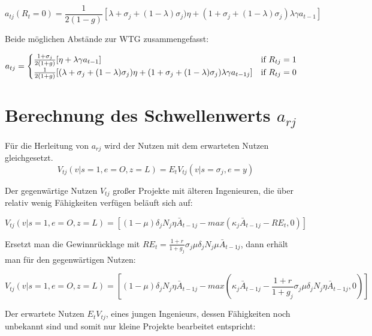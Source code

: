 \begin{equation}
\boxed{a_{tj}(R_{t}=0)=\frac{1}{2(1-g)}\left[\lambda+\sigma_j+(1-\lambda)\sigma_j)\eta+(1+\sigma_j+(1-\lambda)\sigma_j)\lambda\gamma a_{t-1}\right]}
\end{equation}


Beide möglichen Abstände zur WTG zusammengefasst:


\begin{equation}
a_{tj}=\begin{cases}\frac{1+\sigma_j}{2(1+g)}[\eta+\lambda \gamma a_{t-1}] \hfill\text{if  } R_{tj}=1 \\
\frac{1}{2(1+g)}[(\lambda+\sigma_j+(1-\lambda)\sigma_j)\eta+(1+\sigma_j+(1-\lambda)\sigma_j)\lambda\gamma a_{t-1 j}] \quad\hfill\text{if   }R_{tj}=0
\end{cases}
\end{equation}


\section{Berechnung des Schwellenwerts $a_{rj}$}


Für die Herleitung von $a_{rj}$ wird der Nutzen mit dem erwarteten Nutzen gleichgesetzt.
\begin{equation}
V_{tj}(v| s=1, e=O, z=L) = E_{t}V_{tj}(v| s= \sigma_j, e=y)
\end{equation}


Der gegenwärtige Nutzen $V_{tj}$ gro{\ss}er Projekte mit älteren Ingenieuren, die über relativ wenig Fähigkeiten verfügen beläuft sich auf: 


\begin{equation}
V_{tj}(v|s=1, e=O, z=L) = \left [(1- \mu)\delta_{j} N_{j} \eta \bar{A}_{t-1j}- max (\kappa_{j} \bar{A}_{t-1j} -RE_{t}, 0) \right]
\end{equation}


Ersetzt man die Gewinnrücklage mit $RE_{t} =\frac{1+r}{1+g_{j}} \sigma_{j} \mu \delta_{j} N_{j} \mu \bar{A}_{t-1j}$, dann erhält man für den gegenwärtigen Nutzen:


\begin{equation}
V_{tj}(v| s=1, e=O, z=L) = \left [ (1- \mu) \delta_{j} N_{j} \eta \bar{A}_{t-1j}-max\left (\kappa_{j} \bar{A}_{t-1j}- \frac{1+r}{1+g_{j}}\sigma_{j} \mu \delta_{j}N_{j} \eta \bar{A}_{t-1j}, 0\right) \right ]
\end{equation}


Der erwartete Nutzen $E_{t}V_{tj}$, eines jungen Ingenieurs, dessen Fähigkeiten noch unbekannt sind und somit nur kleine Projekte bearbeitet entspricht: 


